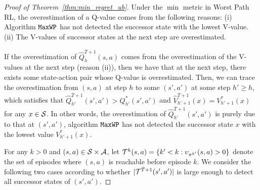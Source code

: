 \begin{proof}[Proof of Theorem~\ref{thm:min_regret_ub}]
	Under the $\min$ metric in Worst Path RL,
	the overestimation of a Q-value comes from the following reasons: (i) Algorithm $\mathtt{MaxWP}$ has not detected the successor state with the lowest V-value. (ii) The V-values of successor states at the next step are overestimated.
	
	If the overestimation of $\hat{Q}^{\bar{T}+1}_h(s,a)$ comes from the overestimation of the V-values at the next step (reason (ii)), then we have that at the next step, there exists some state-action pair whose Q-value is overestimated. Then, we can trace the overestimation from $(s,a)$ at step $h$ to some $(s',a')$ at some step $h' \geq h$, which satisfies that $\hat{Q}^{\bar{T}+1}_{h'}(s',a') > Q^{*}_{h'}(s',a')$ and $\hat{V}^{\bar{T}+1}_{h'+1}(x)=V^{*}_{h'+1}(x)$ for any $x \in \mathcal{S}$. In other words, the overestimation of $\hat{Q}^{\bar{T}+1}_{h'}(s',a')$ is purely due to that at $(s',a')$, algorithm $\mathtt{MaxWP}$ has not detected the successor state $x$ with the lowest value $V^{*}_{h'+1}(x)$.
	
	
	
	For any $k>0$ and $(s,a) \in \mathcal{S} \times \mathcal{A}$, let $\mathcal{T}^k(s,a)=\{k' < k: \upsilon_{\pi^{k'}}(s,a)>0\}$ denote the set of episodes where $(s,a)$ is reachable before episode $k$. 
	We consider the following two cases according to whether $|\mathcal{T}^{\bar{T}+1}(s',a')|$ is large enough to detect all successor states of $(s',a')$.
	

\end{proof}
